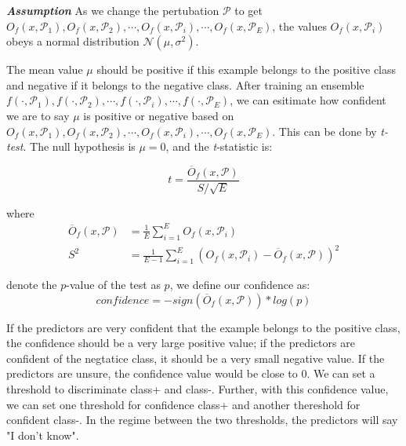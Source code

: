 \documentclass{article}
\begin{document}
\textit{\textbf{Assumption}} As we change the pertubation $\mathcal{P}$ to get $O_f \left(x , \mathcal{P}_1\right), O_f \left(x , \mathcal{P}_2\right),\cdots, O_f \left(x , \mathcal{P}_i\right),\cdots,O_f \left(x , \mathcal{P}_E\right) $, the values $O_f \left(x , \mathcal{P}_i\right)$ obeys a normal distribution $\mathcal{N}(\mu,{\sigma}^2)$. 

The mean value $\mu$ should be positive if this example belongs to the positive class and negative if it belongs to the negative class. After training an ensemble $f \left(\cdot , \mathcal{P}_1\right), f \left(\cdot , \mathcal{P}_2\right),\cdots, f \left(\cdot , \mathcal{P}_i\right),\cdots,f \left(\cdot , \mathcal{P}_E\right) $, we can esitimate how confident we are to say $\mu$ is positive or negative based on $O_f \left(x , \mathcal{P}_1\right), O_f \left(x , \mathcal{P}_2\right),\cdots, O_f \left(x , \mathcal{P}_i\right),\cdots,O_f \left(x , \mathcal{P}_E\right) $. This can be done by \textit{t-test}. The null hypothesis is $\mu = 0$, and the \textit{t}-statistic is: 

\begin{equation}
    t = \frac{\overline{O}_f\left(x , \mathcal{P}\right)}{S/\sqrt{E}}
\end{equation}

where
    \begin{equation}
        \begin{align}
            \overline{O}_f\left(x , \mathcal{P}\right) &= \frac{1}{E} \sum_{i=1}^E O_f\left(x , \mathcal{P}_i\right) \\
            S^2 &= \frac{1}{E-1} \sum_{i=1}^E {(O_f\left(x , \mathcal{P}_i\right) - \overline{O}_f\left(x , \mathcal{P}\right))}^2
        \end{align}
    \end{equation}

denote the $\textit{p}$-value of the test as $\textit{p}$, we define our confidence as:
\begin{equation}
    confidence = -sign( \overline{O}_f\left(x , \mathcal{P}\right))*log(\textit{p})
\end{equation}

If the predictors are very confident that the example belongs to the positive class, the confidence should be a very large positive value; if the predictors are confident of the negtatice class, it should be a very small negative value. If the predictors are unsure, the confidence value would be close to 0. We can set a threshold to discriminate class+ and class-. Further, with this confidence value, we can set one threshold for confidence class+ and another thereshold for confident class-. In the regime between the two thresholds, the predictors will say "I don't know".
\end{document}
